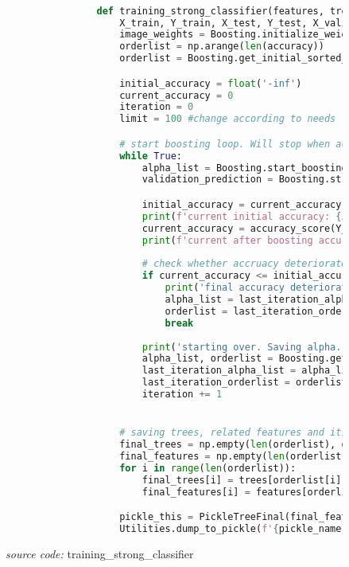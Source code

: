 		\begin{figure}[H]
			\begin{lstlisting}[language=Python, basicstyle=\tiny]

				def training_strong_classifier(features, trees, splits, accuracy, pickle_name):
					X_train, Y_train, X_test, Y_test, X_valid, Y_valid = splits
					image_weights = Boosting.initialize_weight(Y_test)
					orderlist = np.arange(len(accuracy))
					orderlist = Boosting.get_initial_sorted_accuracy(accuracy, orderlist)

					initial_accuracy = float('-inf')
					current_accuracy = 0
					iteration = 0
					limit = 100 #change according to needs

					# start boosting loop. Will stop when accuracy fell or iteration hit limit
					while True:
						alpha_list = Boosting.start_boosting(trees, X_test, Y_test, image_weights, orderlist)
						validation_prediction = Boosting.strong_prediction(trees, orderlist, X_valid, alpha_list)

						initial_accuracy = current_accuracy
						print(f'current initial accuracy: {initial_accuracy}')
						current_accuracy = accuracy_score(Y_valid, validation_prediction)
						print(f'current after boosting accuracy: {current_accuracy}')
						
						# check whether accruacy deteriorate or limit hit
						if current_accuracy <= initial_accuracy or iteration >= limit:
							print('final accuracy deteriorate, rolling back to last iteration...')
							alpha_list = last_iteration_alpha_list
							orderlist = last_iteration_orderlist
							break
						
						print('starting over. Saving alpha...')
						alpha_list, orderlist = Boosting.get_sorted_accuracy(alpha_list, orderlist)
						last_iteration_alpha_list = alpha_list
						last_iteration_orderlist = orderlist
						iteration += 1


					# saving trees, related features and its order in pickle
					final_trees = np.empty(len(orderlist), dtype=object)
					final_features = np.empty(len(orderlist), dtype=object)
					for i in range(len(orderlist)):
						final_trees[i] = trees[orderlist[i]]
						final_features[i] = features[orderlist[i]]

					pickle_this = PickleTreeFinal(final_features, final_trees, alpha_list)
					Utilities.dump_to_pickle(f'{pickle_name}', pickle_this)
			\end{lstlisting}
			\caption{\emph{source code:} training\_strong\_classifier}
			\label{code: training strong classifier}
		\end{figure}

